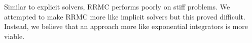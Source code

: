 \documentclass[a4paper,12pt]{article}
\begin{document}

Similar to explicit solvers, RRMC performs poorly on stiff problems.
We attempted to make RRMC more like implicit solvers but this proved difficult.
Instead, we believe that an approach more like exponential integrators
is more viable.








\end{document}
